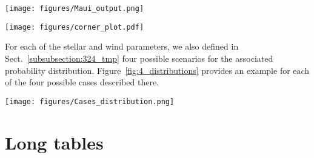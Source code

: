 \documentclass{aa}
\begin{document}
\begin{appendix}
\begin{figure*}[!t]
\centering
\texttt{[image: figures/Maui\_output.png]}
\caption{Summary of the analysis for HD\,198\,478. The sub-panels of the top five rows show the observed spectra (solid black line) and synthetic model (dashed green line) in different diagnostic windows used in the analysis of BSGs. Within each window, the purple horizontal line indicates which sub-regions have not been masked in the analysis. The sub-panels in the bottom two rows are the associated probability distributions of each of the parameters derived in this work. The vertical dashed red and orange lines indicate the maximum and median of the distribution and associated uncertainties.}
\label{fig:output_maui}
\end{figure*}

\begin{figure*}[!t]
\centering
\texttt{[image: figures/corner\_plot.pdf]}
\caption{Corner plot with the PDFs of the seven parameters derived for HD\,198\,478. }
\label{fig:corner_plot}
\end{figure*}

For each of the stellar and wind parameters, we also defined in Sect.~\ref{subsubsection:324_tmp} four possible scenarios for the associated probability distribution. Figure~\ref{fig:4_distributions} provides an example for each of the four possible cases described there.

\begin{figure*}[!t]
\centering
\texttt{[image: figures/Cases\_distribution.png]}
\caption{Illustrative example of the four different PDFs described in Sect.~\ref{subsubsection:324_tmp}. From left to right: a well-behaved distribution (case $a$); an example of an undefined (degenerate) solution ($d$); and two cases for the upper and lower limits ($c$, $b$), respectively.}
\label{fig:4_distributions}
\end{figure*}






\section{Long tables}



\end{appendix}
\end{document}
